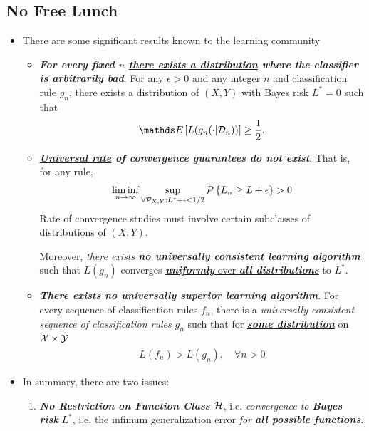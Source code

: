 \documentclass[11pt]{article}
\begin{document}
\subsection{No Free Lunch}
\begin{itemize}
\item \begin{remark} 
There are some significant results known to the learning community
\begin{itemize}
\item \emph{\textbf{For every fixed $n$ \underline{there exists a distribution} where the classifier is \underline{arbitrarily bad}}}. For any $\epsilon > 0$ and any integer $n$ and classification rule $g_n$, there exists a distribution of $(X, Y)$ with Bayes risk $L^{*} = 0$ such that
\begin{align*}
\E{}{L(g_n(\cdot|\cD_n))} \ge \frac{1}{2}.
\end{align*}

\item \emph{\textbf{\underline{Universal rate} of convergence guarantees do not exist}}. 
That is, for any rule,
\begin{align*}
\liminf\limits_{n \rightarrow \infty} \sup_{\forall {\mathcal P}_{X, Y}: L^{*} + \epsilon < 1/2}{\mathcal P}\left\{L_n \ge L + \epsilon\right\} > 0
\end{align*} 
Rate of convergence studies must involve certain subclasses of distributions of $(X, Y)$. 

Moreover, \emph{there exists \textbf{no universally consistent learning algorithm}} such that $L(g_n)$ converges \underline{\emph{\textbf{uniformly}} over \emph{\textbf{all distributions}}} to $L^{*}$.

\item \emph{\textbf{There exists no universally superior learning algorithm}}. For every sequence of classification rules $f_n$, there is a \emph{universally consistent
sequence of classification rules} $g_n$ such that for \underline{\emph{\textbf{some distribution}}} on ${\mathcal X} \times {\mathcal Y}$
\begin{align*}
L(f_n) > L(g_n), \quad \forall n >0
\end{align*}
\end{itemize}
\end{remark}

\item \begin{remark} In summary, there are two issues:
\begin{enumerate}
\item \emph{\textbf{No Restriction on Function Class ${\mathcal H}$}}, i.e. \emph{convergence to \textbf{Bayes risk}} $L^{*}$, i.e. the infimum generalization error \emph{for \textbf{all possible functions}}.


\end{enumerate}
\end{remark}
\end{itemize}
\end{document}
